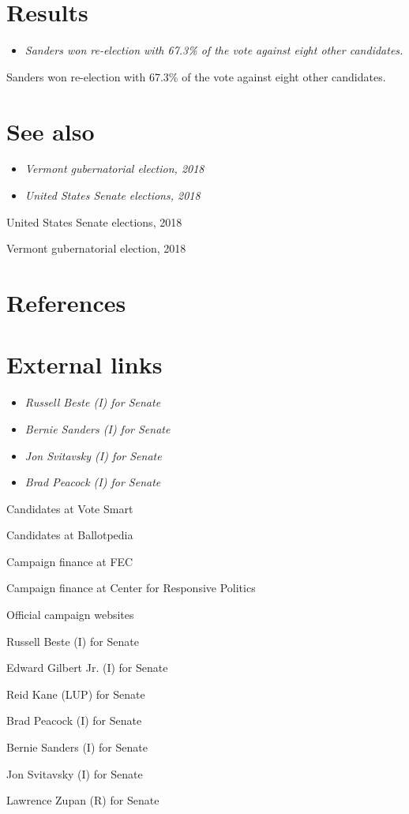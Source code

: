 \section{Results}\label{results-2}

\begin{itemize}
\item
  \emph{Sanders won re-election with 67.3\% of the vote against eight
  other candidates.}
\end{itemize}

Sanders won re-election with 67.3\% of the vote against eight other
candidates.

\section{See also}\label{see-also}

\begin{itemize}
\item
  \emph{Vermont gubernatorial election, 2018}
\item
  \emph{United States Senate elections, 2018}
\end{itemize}

United States Senate elections, 2018

Vermont gubernatorial election, 2018

\section{References}\label{references}

\section{External links}\label{external-links}

\begin{itemize}
\item
  \emph{Russell Beste (I) for Senate}
\item
  \emph{Bernie Sanders (I) for Senate}
\item
  \emph{Jon Svitavsky (I) for Senate}
\item
  \emph{Brad Peacock (I) for Senate}
\end{itemize}

Candidates at Vote Smart

Candidates at Ballotpedia

Campaign finance at FEC

Campaign finance at Center for Responsive Politics

Official campaign websites

Russell Beste (I) for Senate

Edward Gilbert Jr. (I) for Senate

Reid Kane (LUP) for Senate

Brad Peacock (I) for Senate

Bernie Sanders (I) for Senate

Jon Svitavsky (I) for Senate

Lawrence Zupan (R) for Senate
